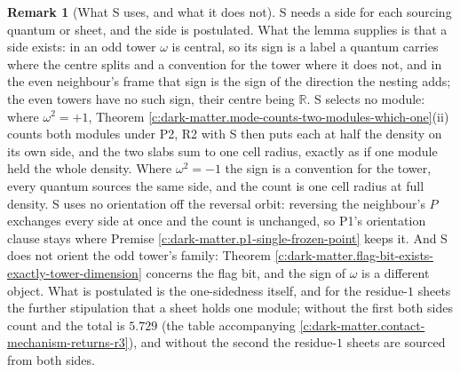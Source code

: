 \documentclass[11pt]{article}
\theoremstyle{definition}
\newtheorem{remark}[theorem]{Remark}
\theoremstyle{plain}
\newcommand{\changedmark}[2]{\marginpar{\raggedright\scriptsize\color{#1}#2}}
\providecommand{\R}{}\renewcommand{\R}{\mathbb{R}}
\begin{document}
\begin{remark}[What S uses, and what it does not]\label{c:note.dark-matter.what-s-uses-what-it-does}
\changedmark{BurntOrange}{changed since the deposit}
S needs a side for each sourcing quantum or sheet, and the side is postulated. What the lemma supplies is that a side exists: in an odd tower $\omega$ is central, so its sign is a label a quantum carries where the centre splits and a convention for the tower where it does not, and in the even neighbour's frame that sign is the sign of the direction the nesting adds; the even towers have no such sign, their centre being $\R$. S selects no module: where $\omega^{2} = +1$, Theorem \ref{c:dark-matter.mode-counts-two-modules-which-one}(ii) counts both modules under P2, R2 with S then puts each at half the density on its own side, and the two slabs sum to one cell radius, exactly as if one module held the whole density. Where $\omega^{2} = -1$ the sign is a convention for the tower, every quantum sources the same side, and the count is one cell radius at full density. S uses no orientation off the reversal orbit: reversing the neighbour's $P$ exchanges every side at once and the count is unchanged, so P1's orientation clause stays where Premise \ref{c:dark-matter.p1-single-frozen-point} keeps it. And S does not orient the odd tower's family: Theorem \ref{c:dark-matter.flag-bit-exists-exactly-tower-dimension} concerns the flag bit, and the sign of $\omega$ is a different object. What is postulated is the one-sidedness itself, and for the residue-$1$ sheets the further stipulation that a sheet holds one module; without the first both sides count and the total is $5.729$ (the table accompanying \ref{c:dark-matter.contact-mechanism-returns-r3}), and without the second the residue-$1$ sheets are sourced from both sides.
\end{remark}
\end{document}
